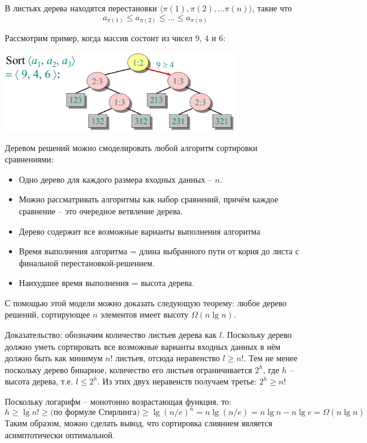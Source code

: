 \documentclass[a4paper,11pt]{article}
\begin{document}
В листьях дерева находятся перестановки $\langle \pi(1), \pi(2), \ldots \pi(n)
\rangle $, такие что
\begin{equation*}
  a_{\pi(1)} \leqslant a_{\pi(2)} \leqslant \ldots \leqslant a_{\pi(n)}  
\end{equation*}

Рассмотрим пример, когда массив состоит из чисел 9, 4 и 6:

\includegraphics[width=4in]{lecture5/tree2.eps}

Деревом решений можно смоделировать любой алгоритм сортировки сравнениями:
\begin{itemize}
\item Одно дерево для каждого размера входных данных -- $n$.
\item Можно рассматривать алгоритмы как набор сравнений, причём каждое сравнение
  -- это очередное ветвление дерева.
\item Дерево содержит все возможные варианты выполнения алгоритма
\item Время выполнения алгоритма = длина выбранного пути от корня до листа с
  финальной перестановкой-решением.
\item Наихудшее время выполнения = высота дерева.
\end{itemize}

С помощью этой модели можно доказать следующую теорему: любое дерево решений,
сортирующее $n$ элементов имеет высоту $\Omega(n \lg n)$.

Доказательство: обозначим количество листьев дерева как $l$. Поскольку дерево
должно уметь сортировать все возможные варианты входных данных в нём должно быть
как минимум $n!$ листьев, отсюда неравенство $l \geqslant n!$. Тем не менее
поскольку дерево бинарное, количество его листьев ограничивается $2^h$, где $h$
-- высота дерева, т.е. $l \leqslant 2^h$. Из этих двух неравенств получаем
третье: $2^h \geqslant n!$

Поскольку логарифм -- монотонно возрастающая функция, то:
\begin{equation*}
  h \geqslant \lg n! \geqslant \text{(по формуле Стирлинга)} \geqslant \lg (n/e)^n
  = n \lg(n/e) = n\lg n - n \lg e = \Omega(n \lg n)
\end{equation*}
Таким образом, можно сделать вывод, что сортировка слиянием является
асимптотически оптимальной.
\end{document}
